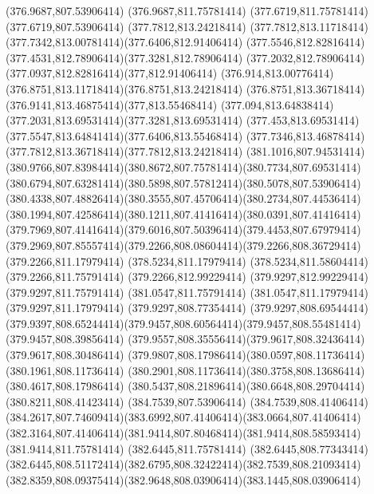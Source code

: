 {{	\closepath
	\moveto(376.9687,807.53906414)
	\lineto(376.9687,811.75781414)
	\lineto(377.6719,811.75781414)
	\lineto(377.6719,807.53906414)
	\closepath
	\moveto(377.7812,813.24218414)
	\curveto(377.7812,813.11718414)(377.7342,813.00781414)(377.6406,812.91406414)
	\curveto(377.5546,812.82816414)(377.4531,812.78906414)(377.3281,812.78906414)
	\curveto(377.2032,812.78906414)(377.0937,812.82816414)(377,812.91406414)
	\curveto(376.914,813.00776414)(376.8751,813.11718414)(376.8751,813.24218414)
	\curveto(376.8751,813.36718414)(376.9141,813.46875414)(377,813.55468414)
	\curveto(377.094,813.64838414)(377.2031,813.69531414)(377.3281,813.69531414)
	\curveto(377.453,813.69531414)(377.5547,813.64841414)(377.6406,813.55468414)
	\curveto(377.7346,813.46878414)(377.7812,813.36718414)(377.7812,813.24218414)
	\closepath
	\moveto(381.1016,807.94531414)
	\curveto(380.9766,807.83984414)(380.8672,807.75781414)(380.7734,807.69531414)
	\curveto(380.6794,807.63281414)(380.5898,807.57812414)(380.5078,807.53906414)
	\curveto(380.4338,807.48826414)(380.3555,807.45706414)(380.2734,807.44536414)
	\curveto(380.1994,807.42586414)(380.1211,807.41416414)(380.0391,807.41416414)
	\curveto(379.7969,807.41416414)(379.6016,807.50396414)(379.4453,807.67979414)
	\curveto(379.2969,807.85557414)(379.2266,808.08604414)(379.2266,808.36729414)
	\lineto(379.2266,811.17979414)
	\lineto(378.5234,811.17979414)
	\lineto(378.5234,811.58604414)
	\lineto(379.2266,811.75791414)
	\lineto(379.2266,812.99229414)
	\lineto(379.9297,812.99229414)
	\lineto(379.9297,811.75791414)
	\lineto(381.0547,811.75791414)
	\lineto(381.0547,811.17979414)
	\lineto(379.9297,811.17979414)
	\lineto(379.9297,808.77354414)
	\lineto(379.9297,808.69544414)
	\curveto(379.9397,808.65244414)(379.9457,808.60564414)(379.9457,808.55481414)
	\lineto(379.9457,808.39856414)
	\curveto(379.9557,808.35556414)(379.9617,808.32436414)(379.9617,808.30486414)
	\curveto(379.9807,808.17986414)(380.0597,808.11736414)(380.1961,808.11736414)
	\curveto(380.2901,808.11736414)(380.3758,808.13686414)(380.4617,808.17986414)
	\curveto(380.5437,808.21896414)(380.6648,808.29704414)(380.8211,808.41423414)
	\closepath
	\moveto(384.7539,807.53906414)
	\lineto(384.7539,808.41406414)
	\curveto(384.2617,807.74609414)(383.6992,807.41406414)(383.0664,807.41406414)
	\curveto(382.3164,807.41406414)(381.9414,807.80468414)(381.9414,808.58593414)
	\lineto(381.9414,811.75781414)
	\lineto(382.6445,811.75781414)
	\lineto(382.6445,808.77343414)
	\curveto(382.6445,808.51172414)(382.6795,808.32422414)(382.7539,808.21093414)
	\curveto(382.8359,808.09375414)(382.9648,808.03906414)(383.1445,808.03906414)
}}
